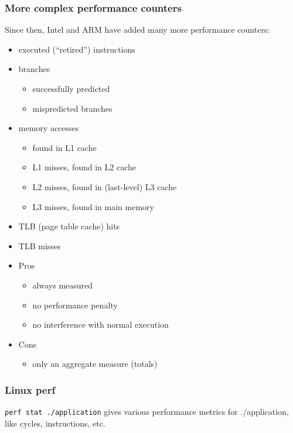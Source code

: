 \documentclass[12pt]{article}
\begin{document}
\subsubsection{More complex performance counters}

Since then, Intel and ARM have added many more performance counters:

\begin{itemize}
  \item executed (“retired”) instructions
  \item branches
  \begin{itemize}
    \item successfully predicted
    \item mispredicted branches
  \end{itemize}
  \item memory accesses
  \begin{itemize}
    \item found in L1 cache
    \item L1 misses, found in L2 cache
    \item L2 misses, found in (last-level) L3 cache
    \item L3 misses, found in main memory
  \end{itemize}
  \item TLB (page table cache) hits
  \item TLB misses
\end{itemize}

\begin{itemize}
  \item Pros
  \begin{itemize}
    \item always measured
    \item no performance penalty
    \item no interference with normal execution
  \end{itemize}
  \item Cons
  \begin{itemize}
    \item only an aggregate measure (totals)
  \end{itemize}
\end{itemize}

\subsubsection{Linux perf}

\texttt{perf stat ./application} gives various performance metrics for ./application, like cycles, instructions, etc. 
\end{document}
